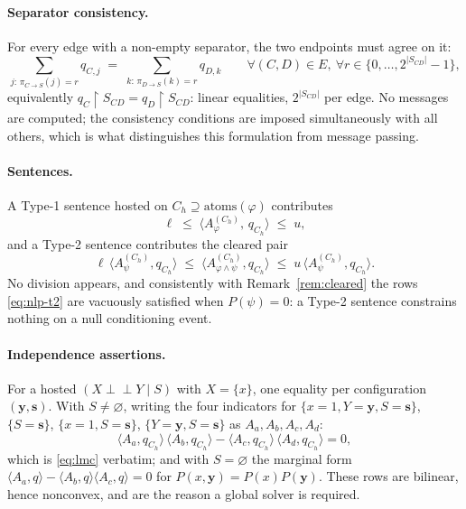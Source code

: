 \documentclass[11pt]{article}
\theoremstyle{definition}
\newcommand{\indep}{\perp\!\!\!\perp}
\newcommand{\atoms}{\mathrm{atoms}}
\newcommand{\restr}{\!\restriction\!}
\begin{document}
\paragraph{Separator consistency.}
For every edge with a non-empty separator, the two endpoints must agree on it:
\begin{equation}\label{eq:nlp-sep}
  \sum_{j:\,\pi_{C\to S}(j)=r}q_{C,j}
  \;=\;\sum_{k:\,\pi_{D\to S}(k)=r}q_{D,k}
  \qquad\forall(C,D)\in E,\ \forall r\in\{0,\dots,2^{|S_{CD}|}-1\},
\end{equation}
equivalently $q_C\restr S_{CD}=q_D\restr S_{CD}$: linear equalities,
$2^{|S_{CD}|}$ per edge. No messages are computed; the consistency conditions are
imposed simultaneously with all others, which is what distinguishes this
formulation from message passing.

\paragraph{Sentences.}
A Type-1 sentence hosted on $C_h\supseteq\atoms(\varphi)$ contributes
\begin{equation}\label{eq:nlp-t1}
  \ell\;\le\;\bigl\langle A^{(C_h)}_{\varphi},\,q_{C_h}\bigr\rangle\;\le\;u,
\end{equation}
and a Type-2 sentence contributes the cleared pair
\begin{equation}\label{eq:nlp-t2}
  \ell\,\bigl\langle A^{(C_h)}_{\psi},q_{C_h}\bigr\rangle
  \;\le\;\bigl\langle A^{(C_h)}_{\varphi\wedge\psi},q_{C_h}\bigr\rangle
  \;\le\;u\,\bigl\langle A^{(C_h)}_{\psi},q_{C_h}\bigr\rangle .
\end{equation}
No division appears, and consistently with Remark~\ref{rem:cleared} the rows
\eqref{eq:nlp-t2} are vacuously satisfied when $P(\psi)=0$: a Type-2 sentence
constrains nothing on a null conditioning event.

\paragraph{Independence assertions.}
For a hosted $(X\indep Y\mid S)$ with $X=\{x\}$, one equality per configuration
$(\mathbf y,\mathbf s)$. With $S\ne\varnothing$, writing the four indicators for
$\{x{=}1,Y{=}\mathbf y,S{=}\mathbf s\}$, $\{S{=}\mathbf s\}$,
$\{x{=}1,S{=}\mathbf s\}$, $\{Y{=}\mathbf y,S{=}\mathbf s\}$ as
$A_a,A_b,A_c,A_d$:
\begin{equation}\label{eq:nlp-lmc}
  \langle A_a,q_{C_h}\rangle\,\langle A_b,q_{C_h}\rangle
  -\langle A_c,q_{C_h}\rangle\,\langle A_d,q_{C_h}\rangle=0 ,
\end{equation}
which is \eqref{eq:lmc} verbatim; and with $S=\varnothing$ the marginal form
$\langle A_a,q\rangle-\langle A_b,q\rangle\langle A_c,q\rangle=0$ for
$P(x,\mathbf y)=P(x)P(\mathbf y)$. These rows are bilinear, hence nonconvex, and
are the reason a global solver is required.
\end{document}
